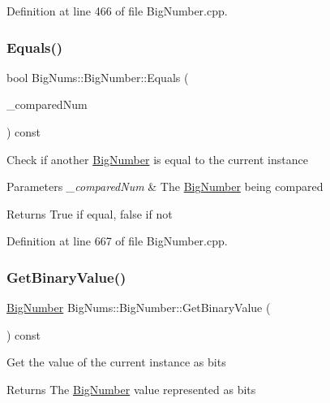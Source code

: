 Definition at line 466 of file Big\+Number.\+cpp.

\mbox{\label{class_big_nums_1_1_big_number_af459e1abf1ec5721b7288979e71cd672}} 
\subsubsection{\texorpdfstring{Equals()}{Equals()}}
{\footnotesize\ttfamily bool Big\+Nums\+::\+Big\+Number\+::\+Equals (\begin{DoxyParamCaption}\item[{const \mbox{\hyperlink{class_big_nums_1_1_big_number}{Big\+Number}} \&}]{\+\_\+compared\+Num }\end{DoxyParamCaption}) const}

Check if another \mbox{\hyperlink{class_big_nums_1_1_big_number}{Big\+Number}} is equal to the current instance 
\begin{DoxyParams}{Parameters}
{\em \+\_\+compared\+Num} & The \mbox{\hyperlink{class_big_nums_1_1_big_number}{Big\+Number}} being compared \\
\hline
\end{DoxyParams}
\begin{DoxyReturn}{Returns}
True if equal, false if not 
\end{DoxyReturn}


Definition at line 667 of file Big\+Number.\+cpp.

\mbox{\label{class_big_nums_1_1_big_number_a02c53d5b7c27e3b80c5f8ee5982a8875}} 
\subsubsection{\texorpdfstring{GetBinaryValue()}{GetBinaryValue()}}
{\footnotesize\ttfamily \mbox{\hyperlink{class_big_nums_1_1_big_number}{Big\+Number}} Big\+Nums\+::\+Big\+Number\+::\+Get\+Binary\+Value (\begin{DoxyParamCaption}{ }\end{DoxyParamCaption}) const}

Get the value of the current instance as bits \begin{DoxyReturn}{Returns}
The \mbox{\hyperlink{class_big_nums_1_1_big_number}{Big\+Number}} value represented as bits 
\end{DoxyReturn}


